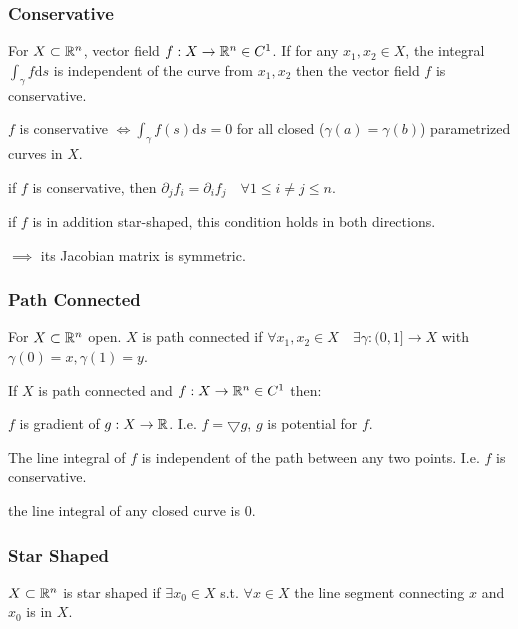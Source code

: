 \subsubsection{Conservative}
For $X \subset \mathbb{R}^n$, vector field $f: X \to \mathbb{R}^n \in C^1$. If for any $x_1, x_2 \in X$, the integral $\int_{\gamma} f \mathrm{d}s$ is independent of the curve from $x_1, x_2$ then the vector field $f$ is conservative.

\begin{compactitem}
    \item $f$ is conservative $\iff \int_{\gamma} f(s) \mathrm{d}s = 0$ for all closed ($\gamma(a) = \gamma(b)$) parametrized curves in $X$.
    \item if $f$ is conservative, then $\partial_j f_i = \partial_i f_j \quad \forall 1 \le i \neq j \le n$.
        \begin{compactitem}
            \item if $f$ is in addition star-shaped, this condition holds in both directions.
            \item $\implies$ its Jacobian matrix is symmetric.
        \end{compactitem}
\end{compactitem}

\subsubsection{Path Connected}
For $X \subset \mathbb{R}^n$ open. $X$ is path connected if $\forall x_1, x_2 \in X \quad \exists \gamma: (0, 1] \to X$ with $\gamma(0) = x, \gamma(1) = y$.

If $X$ is path connected and $f: X \to \mathbb{R}^n \in C^1$ then:
\begin{compactitem}
    \item $f$ is gradient of $g: X \to \mathbb{R}$. I.e. $f = \bigtriangledown g$, $g$ is potential for $f$.
    \item The line integral of $f$ is independent of the path between any two points. I.e. $f$ is conservative.
    \item the line integral of any closed curve is $0$.
\end{compactitem}

\subsubsection{Star Shaped}
$X \subset \mathbb{R}^n$ is star shaped if $\exists x_0 \in X$ s.t. $\forall x \in X$ the line segment connecting $x$ and $x_0$ is in $X$.

